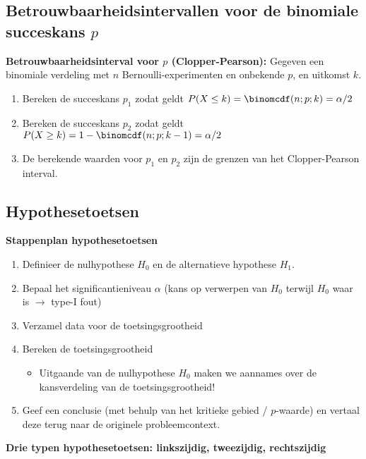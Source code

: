 \subsection*{Betrouwbaarheidsintervallen voor de binomiale succeskans $p$}
    \textbf{Betrouwbaarheidsinterval voor \boldmath$p$ (Clopper-Pearson):}
    Gegeven een binomiale verdeling met $n$ Bernoulli-experimenten en onbekende $p$, en uitkomst $k$.
    \begin{enumerate}
        \item Bereken de succeskans $p_1$ zodat geldt $P(X \le k) = \binomcdf(n; p; k) = \alpha/2$
        \item Bereken de succeskans $p_2$ zodat geldt $P(X \ge k) = 1 - \binomcdf(n; p; k-1) = \alpha/2$
        \item De berekende waarden voor $p_1$ en $p_2$ zijn de grenzen van het Clopper-Pearson interval.
    \end{enumerate}

\subsection*{Hypothesetoetsen}
    \textbf{Stappenplan hypothesetoetsen}
    \begin{enumerate}
        \item Definieer de nulhypothese $H_0$ en de alternatieve hypothese $H_1$.
        \item Bepaal het significantieniveau $\alpha$ (kans op verwerpen van $H_0$ terwijl $H_0$ waar is $\rightarrow$ type-I fout)
        \item Verzamel data voor de toetsingsgrootheid
        \item Bereken de toetsingsgrootheid
        \begin{itemize}
            \item Uitgaande van de nulhypothese $H_0$ maken we aannames over de kansverdeling van de toetsingsgrootheid!
        \end{itemize}
        \item Geef een conclusie (met behulp van het kritieke gebied / $p$-waarde) en vertaal deze terug naar de originele probleemcontext.
    \end{enumerate}

    \newpage
    \textbf{Drie typen hypothesetoetsen: linkszijdig, tweezijdig, rechtszijdig}
    
